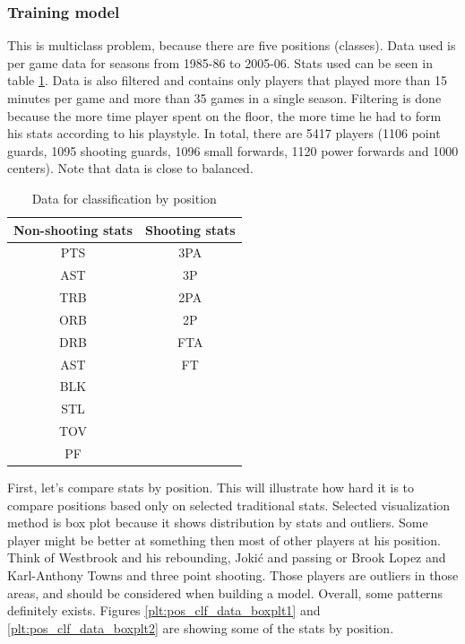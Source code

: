\documentclass[a4paper]{article}
\begin{document}
\subsubsection{Training model}
\label{subsubsec:pos_clf_training}

This is multiclass problem, because there are five positions (classes). Data used is per game data for seasons from 1985-86 to 2005-06. Stats used can be seen in table \ref{tab:pos_clf_data}. Data is also filtered and contains only players that played more than 15 minutes per game and more than 35 games in a single season. Filtering is done because the more time player spent on the floor, the more time he had to form his stats according to his playstyle. In total, there are 5417 players (1106 point guards, 1095 shooting guards, 1096 small forwards, 1120 power forwards and 1000 centers). Note that data is close to balanced.

\begin{table}[!h]
\begin{center}
\begin{tabular}{|c|c|} \hline
Non-shooting stats & Shooting stats \\ \hline
PTS & 3PA\\
AST & 3P\\
TRB & 2PA \\
ORB & 2P \\
DRB & FTA \\
AST & FT \\
BLK & \\
STL & \\
TOV & \\
PF & \\ \hline
\end{tabular}
\caption{Data for classification by position}
\label{tab:pos_clf_data}
\end{center}
\end{table}

First, let's compare stats by position. This will illustrate how hard it is to compare positions based only on selected traditional stats. Selected visualization method is box plot \cite{boxplots} because it shows distribution by stats and outliers. Some player might be better at something then most of other players at his position. Think of Westbrook and his rebounding, Jokić and passing or Brook Lopez and Karl-Anthony Towns and three point shooting. Those players are outliers in those areas, and should be considered when building a model. Overall, some patterns definitely exists. Figures \ref{plt:pos_clf_data_boxplt1} and \ref{plt:pos_clf_data_boxplt2} are showing some of the stats by position.
\end{document}
